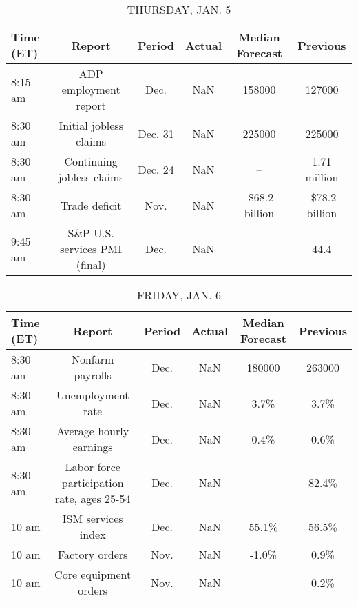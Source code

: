 \documentclass{article}%
\begin{document}
%


\begin{table}[htbp]%
\caption{THURSDAY, JAN. 5}%
\centering%
\begin{adjustbox}{width=1\textwidth}%
\begin{tabular}{lccccc}
\toprule
Time (ET) &                        Report &  Period & Actual & Median Forecast &       Previous \\
\midrule
  8:15 am &         ADP employment report &    Dec. &    NaN &          158000 &         127000 \\
  8:30 am &        Initial jobless claims & Dec. 31 &    NaN &          225000 &         225000 \\
  8:30 am &     Continuing jobless claims & Dec. 24 &    NaN &              -- &   1.71 million \\
  8:30 am &                 Trade deficit &    Nov. &    NaN &  -\$68.2 billion & -\$78.2 billion \\
  9:45 am & S\&P U.S. services PMI (final) &    Dec. &    NaN &              -- &           44.4 \\
\bottomrule
\end{tabular}
%
\end{adjustbox}%
\end{table}

%


\begin{table}[htbp]%
\caption{FRIDAY, JAN. 6}%
\centering%
\begin{adjustbox}{width=1\textwidth}%
\begin{tabular}{lccccc}
\toprule
Time (ET) &                                     Report & Period & Actual & Median Forecast & Previous \\
\midrule
  8:30 am &                           Nonfarm payrolls &   Dec. &    NaN &          180000 &   263000 \\
  8:30 am &                          Unemployment rate &   Dec. &    NaN &            3.7\% &     3.7\% \\
  8:30 am &                    Average hourly earnings &   Dec. &    NaN &            0.4\% &     0.6\% \\
  8:30 am & Labor force participation rate, ages 25-54 &   Dec. &    NaN &              -- &    82.4\% \\
    10 am &                         ISM services index &   Dec. &    NaN &           55.1\% &    56.5\% \\
    10 am &                             Factory orders &   Nov. &    NaN &           -1.0\% &     0.9\% \\
    10 am &                      Core equipment orders &   Nov. &    NaN &              -- &     0.2\% \\
\bottomrule
\end{tabular}
%
\end{adjustbox}%
\end{table}
\end{document}
